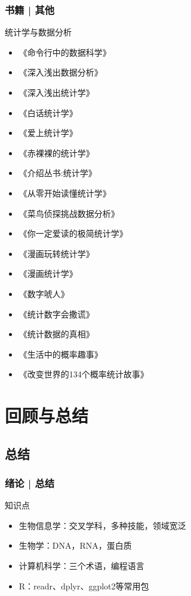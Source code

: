 \begin{frame}
  \frametitle{书籍 | 其他}
    \begin{block}{统计学与数据分析}
      \begin{multicols}{2}
    \begin{itemize}
      \item 《命令行中的数据科学》
      \item 《深入浅出数据分析》
      \item 《深入浅出统计学》
      \item 《白话统计学》
      \item 《爱上统计学》
      \item 《赤裸裸的统计学》
      \item 《介绍丛书:统计学》
      \item 《从零开始读懂统计学》
      \item 《菜鸟侦探挑战数据分析》
      \item 《你一定爱读的极简统计学》
      \item 《漫画玩转统计学》
      \item 《漫画统计学》
      \item 《数字唬人》
      \item 《统计数字会撒谎》
      \item 《统计数据的真相》
      \item 《生活中的概率趣事》
      \item 《改变世界的134个概率统计故事》
    \end{itemize}
  \end{multicols}
  \end{block}
\end{frame}

\section{回顾与总结}
\subsection{总结}
\begin{frame}
  \frametitle{绪论 | 总结}
  \begin{block}{知识点}
    \begin{itemize}
      \item 生物信息学：交叉学科，多种技能，领域宽泛
      \item 生物学：DNA，RNA，蛋白质
      \item 计算机科学：三个术语，编程语言
      \item R：readr、dplyr、ggplot2等常用包
    \end{itemize}
  \end{block}
\end{frame}

